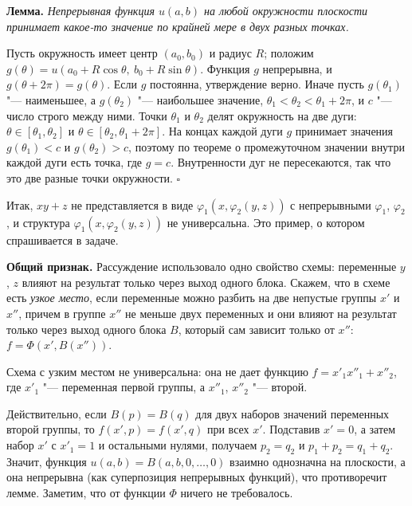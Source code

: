 \begin{solution}[5 (\S\,5)]
\textbf{Лемма.} \emph{Непрерывная функция $u(a,b)$ на любой окружности плоскости
принимает какое-то значение по крайней мере в двух разных точках.}

Пусть окружность имеет центр $(a_0,b_0)$ и радиус $R$; положим
$g(\theta)=u(a_0+R\cos\theta,\ b_0+R\sin\theta)$. Функция $g$ непрерывна,
и $g(\theta+2\pi)=g(\theta)$. Если $g$ постоянна, утверждение верно. Иначе
пусть $g(\theta_1)$ "--- наименьшее, а $g(\theta_2)$ "--- наибольшее значение,
$\theta_1<\theta_2<\theta_1+2\pi$, и $c$ "--- число строго между ними. Точки
$\theta_1$ и $\theta_2$ делят окружность на две дуги: $\theta\in[\theta_1,\theta_2]$
и $\theta\in[\theta_2,\theta_1+2\pi]$. На концах каждой дуги $g$ принимает
значения $g(\theta_1)<c$ и $g(\theta_2)>c$, поэтому по теореме о промежуточном
значении внутри каждой дуги есть точка, где $g=c$. Внутренности дуг не
пересекаются, так что это две разные точки окружности. $\square$

Итак, $xy+z$ не представляется в виде $\varphi_1(x,\varphi_2(y,z))$
с непрерывными $\varphi_1$, $\varphi_2$, и структура $\varphi_1(x,\varphi_2(y,z))$
не универсальна. Это пример, о котором спрашивается в задаче.

\textbf{Общий признак.} Рассуждение использовало одно свойство схемы:
переменные $y$, $z$ влияют на результат только через выход одного блока.
Скажем, что в схеме есть \emph{узкое место}, если переменные можно разбить
на две непустые группы $x'$ и $x''$, причем в группе $x''$ не меньше двух
переменных и они влияют на результат только через выход одного блока $B$,
который сам зависит только от $x''$: $f=\Phi(x',B(x''))$.
\begin{keystmt}
Схема с узким местом не универсальна: она не дает функцию
$f=x'_1x''_1+x''_2$, где $x'_1$ "--- переменная первой группы,
а $x''_1$, $x''_2$ "--- второй.
\end{keystmt}
Действительно, если $B(p)=B(q)$ для двух наборов значений переменных второй
группы, то $f(x',p)=f(x',q)$ при всех $x'$. Подставив $x'=0$, а затем набор
$x'$ с $x'_1=1$ и остальными нулями, получаем $p_2=q_2$ и $p_1+p_2=q_1+q_2$.
Значит, функция $u(a,b)=B(a,b,0,\dots,0)$ взаимно однозначна на плоскости,
а она непрерывна (как суперпозиция непрерывных функций), что противоречит
лемме. Заметим, что от функции $\Phi$ ничего не требовалось.


\end{solution}
